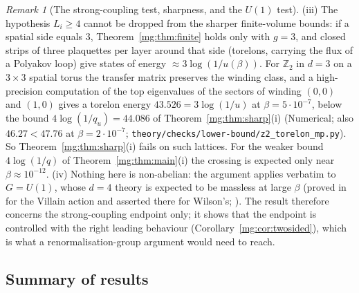 \documentclass[11pt,a4paper]{article}
\theoremstyle{definition}
\theoremstyle{remark}
\newtheorem{remark}[theorem]{Remark}
\newcommand{\IIIref}[3]{\cite[#1~`#2' (\texttt{#3})]{III}}
\begin{document}
\begin{remark}[The strong-coupling test, sharpness, and the $U(1)$ test]
(iii) The hypothesis $L_i\ge4$ cannot be dropped from the sharper finite-volume bounds: if a spatial side equals $3$,
Theorem~\ref{mg:thm:finite} holds only with $g=3$, and closed strips of three plaquettes per layer around that side (torelons, carrying the
flux of a Polyakov loop) give states of energy $\approx3\log(1/u(\beta))$. For $\mathbb Z_2$ in $d=3$ on a $3\times3$ spatial torus the transfer
matrix preserves the winding class, and a high-precision computation of the top eigenvalues of the sectors of winding $(0,0)$ and $(1,0)$ gives a
torelon energy $43.526=3\log(1/u)$ at $\beta=5\cdot10^{-7}$, below the bound $4\log(1/q_u)=44.086$ of Theorem~\ref{mg:thm:sharp}(i) (Numerical;
also $46.27<47.76$ at $\beta=2\cdot10^{-7}$; \texttt{theory/checks/lower-bound/z2\_torelon\_mp.py}). So Theorem~\ref{mg:thm:sharp}(i) fails on
such lattices. For the weaker bound $4\log(1/q)$ of Theorem~\ref{mg:thm:main}(i) the crossing is expected only near $\beta\approx10^{-12}$. (iv) Nothing here is non-abelian: the argument applies verbatim to $G=U(1)$, whose $d=4$ theory is expected to be massless at large
$\beta$ (proved in \cite{FS82} for the Villain action and asserted there for Wilson's; \IIIref{Remark}{The $U(1)$ test}{al:rem:u1test}). The
result therefore concerns the strong-coupling endpoint only; it shows that the endpoint is controlled with the right leading behaviour
(Corollary~\ref{mg:cor:twosided}), which is what a renormalisation-group argument would need to reach.
\end{remark}

\subsection*{Summary of results}
\end{document}
